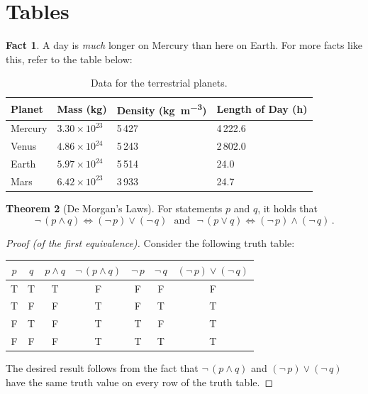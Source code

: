\documentclass[11pt,letterpaper,titlepage]{article}
\numberwithin{equation}{section}
\numberwithin{figure}{section}
\numberwithin{table}{section}
\numberwithin{algorithm}{section}
\theoremstyle{definition}
\newtheorem{theorem}{Theorem}[section] %
\newtheorem{fact}[theorem]{Fact} %
\begin{document}
\section{Tables}
    
\begin{fact}
    A day is \emph{much} longer on Mercury than here on Earth. For more facts like this, refer to the table below:
\end{fact}
    
\begin{table}[H]
    \centering
    \caption{Data for the terrestrial planets. \label{tbl:planets}} 
    \begin{tabular}{llll}
        \toprule
        \textbf{Planet}     &\textbf{Mass (\si{\kilo\gram})}    & \textbf{Density (\si{\kilo\gram\per\meter\cubed})} & \textbf{Length of Day (\si{\hour})}\\
        \midrule
        Mercury & $3.30\times 10^{23}$  & 5\,427 & 4\,222.6\\
        Venus     & $4.86\times 10^{24}$ & 5\,243 & 2\,802.0    \\
        Earth    & $5.97\times 10^{24}$ & 5\,514 & 24.0 \\
        Mars    & $6.42\times 10^{23}$ & 3\,933 & 24.7\\
        \bottomrule
    \end{tabular}
\end{table}

\begin{theorem}[De Morgan's Laws]
    For statements $p$ and $q$, it holds that \[\neg\,(p\wedge q)\iff (\neg\, p)\vee (\neg\, q)\:\:\:\text{and}\:\:\:\neg\,(p\vee q)\iff (\neg\, p)\wedge (\neg\, q)\,.\]
\end{theorem}

\begin{proof}[Proof (of the first equivalence)]
    Consider the following truth table:
\begin{center}
\begin{tabular}{ccccccc}
    \toprule
    \textbf{$p$} & \textbf{$q$} & \textbf{$p\wedge q$} & \textbf{$\neg\,(p\wedge q)$} & \textbf{$\neg\, p$} & \textbf{$\neg\, q$} & \textbf{$(\neg\,p)\vee (\neg\, q)$} \\
    \midrule
    T & T & T & F & F & F & F\\
    T & F & F & T & F & T & T\\
    F & T & F & T & T & F & T\\
    F & F & F & T & T & T & T\\
    \bottomrule
\end{tabular}
\end{center}
The desired result follows from the fact that $\neg\,(p\wedge q)$ and $(\neg\, p)\vee (\neg\, q)$ have the same truth value on every row of the truth table.
\end{proof}
\end{document}
